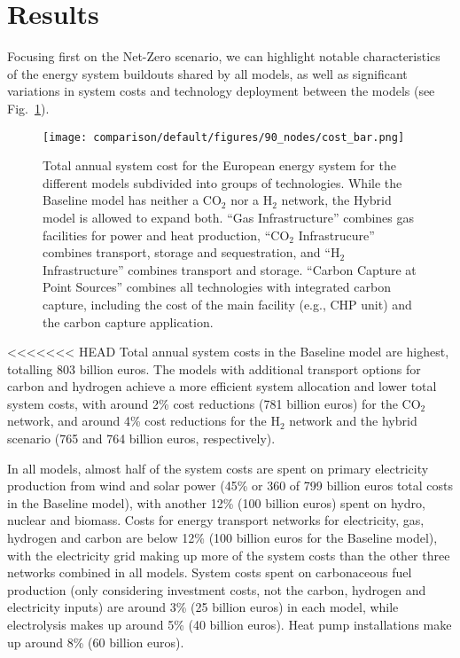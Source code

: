 \documentclass[twocolumn]{article}
\newcommand{\carbon}{CO$_2$}
\newcommand{\hydrogen}{H$_2$}
\begin{document}
\section{Results}
\label{sec:results}


Focusing first on the Net-Zero scenario, we can highlight notable characteristics of the energy system buildouts shared by all models, as well as significant variations in system costs and technology deployment between the models (see Fig.~\ref{fig:cost_bar}).

\begin{figure}[ht!]
    \centering
    \texttt{[image: comparison/default/figures/90\_nodes/cost\_bar.png]}
    \caption[short]{Total annual system cost for the European energy system for the different models subdivided into groups of technologies. While the Baseline model has neither a \carbon{} nor a \hydrogen{} network, the Hybrid model is allowed to expand both. ``Gas Infrastructure'' combines gas facilities for power and heat production, ``\carbon{} Infrastrucure'' combines transport, storage and sequestration, and ``H$_2$ Infrastructure'' combines transport and storage. ``Carbon Capture at Point Sources'' combines all technologies with integrated carbon capture, including the cost of the main facility (e.g., CHP unit) and the carbon capture application.}
    \label{fig:cost_bar}
\end{figure}

<<<<<<< HEAD
Total annual system costs in the Baseline model are highest, totalling \label{}803 billion euros. The models with additional transport options for carbon and hydrogen achieve a more efficient system allocation and lower total system costs, with around \label{}2\% cost reductions (\label{}781 billion euros) for the \carbon{} network, and around \label{}4\% cost reductions for the \hydrogen{} network and the hybrid scenario (\label{}765 and \label{}764 billion euros, respectively).

In all models, almost half of the system costs are spent on primary electricity production from wind and solar power (\label{}45\% or \label{}360 of \label{}799 billion euros total costs in the Baseline model), with another \label{}12\% (\label{}100 billion euros) spent on hydro, nuclear and biomass. Costs for energy transport networks for electricity, gas, hydrogen and carbon are below \label{}12\% (\label{}100 billion euros for the Baseline model), with the electricity grid making up more of the system costs than the other three networks combined in all models. System costs spent on carbonaceous fuel production (only considering investment costs, not the carbon, hydrogen and electricity inputs) are around \label{}3\% (\label{}25 billion euros) in each model, while electrolysis makes up around \label{}5\% (\label{}40 billion euros). Heat pump installations make up around \label{}8\% (60 billion euros).
\end{document}
